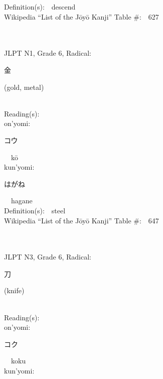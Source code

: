 \begin{multicols}{2}
Definition(s):\ \ descend \\
Wikipedia ``List of the J\=oy\=o Kanji'' Table \#:\ \ 627 \\
\ \ \\
{\fontsize{34pt}{40pt}  }\ \ \\  %
{JLPT N1, Grade 6, Radical:\ \ {\begin{CJK}{UTF8}{min} 金 \end{CJK}} (gold, metal) } \\
Reading(s):\ \ \\
{\hspace*{1em}}on'yomi:\ \ \\
{\hspace*{2em}}{\begin{CJK}{UTF8}{min} コウ \end{CJK}}\ \ k\=o\ \ \\
{\hspace*{1em}}kun'yomi:\ \ \\
{\hspace*{2em}}{\begin{CJK}{UTF8}{min} はがね \end{CJK}}\ \ hagane\ \ \\
Definition(s):\ \ steel \\
Wikipedia ``List of the J\=oy\=o Kanji'' Table \#:\ \ 647 \\
\ \ \\
{\fontsize{34pt}{40pt}  }\ \ \\  %
{JLPT N3, Grade 6, Radical:\ \ {\begin{CJK}{UTF8}{min} 刀 \end{CJK}} (knife) } \\
Reading(s):\ \ \\
{\hspace*{1em}}on'yomi:\ \ \\
{\hspace*{2em}}{\begin{CJK}{UTF8}{min} コク \end{CJK}}\ \ koku\ \ \\
{\hspace*{1em}}kun'yomi:\ \ \\

\end{multicols}
